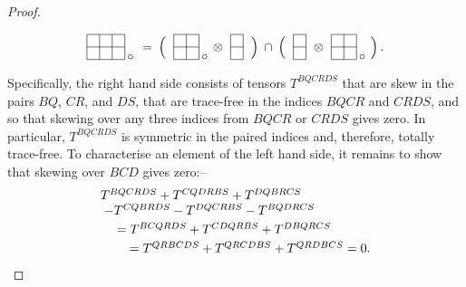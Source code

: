 \documentclass[a4paper,12pt]{amsart}
\begin{document}
\begin{proof}
\begin{equation}\label{intersect}\raisebox{-10pt}{\begin{picture}(35,30)
\put(0,5){\line(1,0){30}}
\put(0,15){\line(1,0){30}}
\put(0,25){\line(1,0){30}}
\put(0,5){\line(0,1){20}}
\put(10,5){\line(0,1){20}}
\put(20,5){\line(0,1){20}}
\put(30,5){\line(0,1){20}}
\put(32,7){\makebox(0,0)[l]{$\circ$}}
\end{picture}
\raisebox{12pt}{$\;\;=\:\Big(\;$}
\begin{picture}(25,30)
\put(0,5){\line(1,0){20}}
\put(0,15){\line(1,0){20}}
\put(0,25){\line(1,0){20}}
\put(0,5){\line(0,1){20}}
\put(10,5){\line(0,1){20}}
\put(20,5){\line(0,1){20}}
\put(22,7){\makebox(0,0)[l]{$\circ$}}
\end{picture}
\raisebox{12pt}{$\;\otimes\;$}
\begin{picture}(10,30)
\put(0,5){\line(1,0){10}}
\put(0,15){\line(1,0){10}}
\put(0,25){\line(1,0){10}}
\put(0,5){\line(0,1){20}}
\put(10,5){\line(0,1){20}}
\end{picture}
\raisebox{12pt}{$\;\Big)\:\cap\:\Big(\;$}
\begin{picture}(10,30)
\put(0,5){\line(1,0){10}}
\put(0,15){\line(1,0){10}}
\put(0,25){\line(1,0){10}}
\put(0,5){\line(0,1){20}}
\put(10,5){\line(0,1){20}}
\end{picture}
\raisebox{12pt}{$\;\otimes\;$}
\begin{picture}(25,30)
\put(0,5){\line(1,0){20}}
\put(0,15){\line(1,0){20}}
\put(0,25){\line(1,0){20}}
\put(0,5){\line(0,1){20}}
\put(10,5){\line(0,1){20}}
\put(20,5){\line(0,1){20}}
\put(22,7){\makebox(0,0)[l]{$\circ$}}
\end{picture}
\raisebox{12pt}{$\;\Big)\,.$}}\end{equation}
Specifically, the right hand side consists of tensors $T^{BQCRDS}$ that are
skew in the pairs $BQ$, $CR$, and $DS$, that are trace-free in the indices
$BQCR$ and $CRDS$, and so that skewing over any three indices from $BQCR$ or
$CRDS$ gives zero. In particular, $T^{BQCRDS}$ is symmetric in the paired
indices and, therefore, totally trace-free. To characterise an element of the
left hand side, it remains to show that skewing over $BCD$ gives zero:--
$$\begin{array}l
T^{BQCRDS}+T^{CQDRBS}+T^{DQBRCS}\\
\;-T^{CQBRDS}-T^{DQCRBS}-T^{BQDRCS}\\[3pt]
\;\quad=T^{BCQRDS}+T^{CDQRBS}+T^{DBQRCS}\\[3pt]
\;\qquad=T^{QRBCDS}+T^{QRCDBS}+T^{QRDBCS}=0.\end{array}$$

\end{proof}
\end{document}
